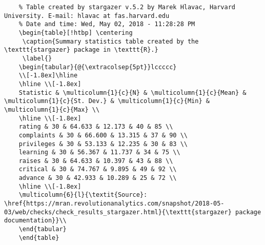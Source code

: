 \documentclass[11pt]{article}
\begin{document}
\begin{lstlisting}
    % Table created by stargazer v.5.2 by Marek Hlavac, Harvard University. E-mail: hlavac at fas.harvard.edu
    % Date and time: Wed, May 02, 2018 - 11:28:28 PM
    \begin{table}[!htbp] \centering
     \caption{Summary statistics table created by the \texttt{stargazer} package in \texttt{R}.}
     \label{}
    \begin{tabular}{@{\extracolsep{5pt}}lccccc}
    \\[-1.8ex]\hline
    \hline \\[-1.8ex]
    Statistic & \multicolumn{1}{c}{N} & \multicolumn{1}{c}{Mean} & \multicolumn{1}{c}{St. Dev.} & \multicolumn{1}{c}{Min} & \multicolumn{1}{c}{Max} \\
    \hline \\[-1.8ex]
    rating & 30 & 64.633 & 12.173 & 40 & 85 \\
    complaints & 30 & 66.600 & 13.315 & 37 & 90 \\
    privileges & 30 & 53.133 & 12.235 & 30 & 83 \\
    learning & 30 & 56.367 & 11.737 & 34 & 75 \\
    raises & 30 & 64.633 & 10.397 & 43 & 88 \\
    critical & 30 & 74.767 & 9.895 & 49 & 92 \\
    advance & 30 & 42.933 & 10.289 & 25 & 72 \\
    \hline \\[-1.8ex]
    \multicolumn{6}{l}{\textit{Source}: \href{https://mran.revolutionanalytics.com/snapshot/2018-05-03/web/checks/check_results_stargazer.html}{\texttt{stargazer} package documentation}}\\
    \end{tabular}
    \end{table}
\end{lstlisting}
\end{document}
